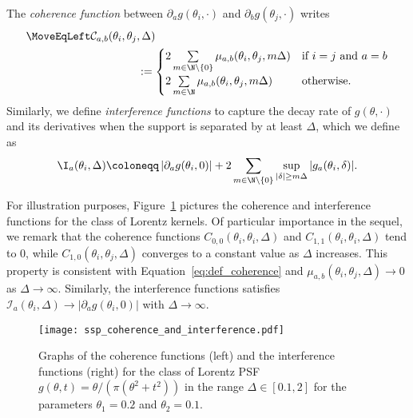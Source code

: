 \documentclass[conference,english,final,svgnames]{IEEEtran}
\begin{document}
The \emph{coherence function} between $\partial_a g(\theta_i, \cdot)$ and $\partial_b g(\theta_j, \cdot)$ writes
\begin{align}
\label{eq:def_coherence_function}
\MoveEqLeft \mathcal{C}_{a,b}(\theta_i, \theta_j, \Delta) & \nonumber \\
    & \hspace{-16pt}:= \begin{cases}
        2\sum\limits_{m \in \N \setminus \{0\}} \mu_{a,b}(\theta_i, \theta_j, m\Delta) & \text{if } i=j\text{ and }a = b \\
        2\sum\limits_{m \in \N } \mu_{a,b}(\theta_i, \theta_j, m\Delta) & \text{otherwise.}
    \end{cases}
\end{align}
Similarly, we define \emph{interference functions} to capture the decay rate of $g(\theta, \cdot)$ and its derivatives when the support is separated by at least $\Delta$, which we define as
\begin{equation}\label{eq:def_interference_functions}
    \I_a(\theta_i, \Delta) \coloneqq \left|\partial_ag(\theta_i, 0)\right| +  2 \sum_{m \in {\N \setminus \{0\}}} \sup_{|\delta| \geq m\Delta}|g_a(\theta_i, \delta)|.
\end{equation}

For illustration purposes, Figure~\ref{fig:coherence} pictures the coherence and interference functions for the class of Lorentz kernels. Of particular importance in the sequel, we remark that the coherence functions $C_{0,0}(\theta_i, \theta_i, \Delta)$ and $C_{1,1}(\theta_i, \theta_i, \Delta)$ tend to $0$, while $C_{1,0}(\theta_i, \theta_j, \Delta)$ converges to a constant value as $\Delta$ increases. This property is consistent with Equation~\eqref{eq:def_coherence} and $\mu_{a,b}(\theta_i, \theta_j,\Delta) \to 0$ as $\Delta \to \infty$.  Similarly, the interference functions satisfies $\mathcal{I}_a(\theta_i,\Delta) \to \left|\partial_a g(\theta_i, 0)\right|$ with $\Delta \to \infty$.

\begin{figure}[t]
    \centering
    \texttt{[image: ssp\_coherence\_and\_interference.pdf]}
    \vspace{-12pt}
    \caption{Graphs of the coherence functions (left) and the interference functions (right) for the class of Lorentz PSF $g(\theta, t) = \theta / (\pi (\theta^2 + t^2))$ in the range $\Delta \in [0.1, 2]$ for the parameters $\theta_1 = 0.2$ and $\theta_2=0.1$.}
    \label{fig:coherence}
\end{figure}
\end{document}
